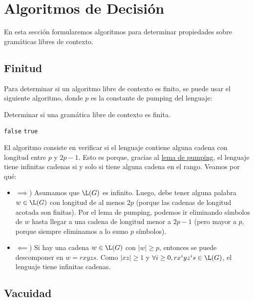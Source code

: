 \section{Algoritmos de Decisión}

En esta sección formularemos algoritmos para determinar propiedades sobre gramáticas libres de contexto.

\subsection{Finitud}

Para determinar si un algoritmo libre de contexto es finito, se puede usar el siguiente algoritmo, donde $p$ es la constante de pumping del lenguaje:

\begin{algorithm}[H]
    \caption{Determinar si una gramática libre de contexto es finita.}
    \label{glc-finita}
    \begin{algorithmic}[1]
        \State \Return \texttt{false}
        \Else
        \State \Return \texttt{true}
        \EndIf
        \EndProcedure
    \end{algorithmic}
\end{algorithm}

El algoritmo consiste en verificar si el lenguaje contiene alguna cadena con longitud entre $p$ y $2p - 1$. Esto es porque, gracias al \hyperref[pumping-libre-de-contexto]{lema de pumping}, el lenguaje tiene infinitas cadenas si y solo si tiene alguna cadena en el rango. Veamos por qué:
\begin{itemize}
    \item $\implies$) Asumamos que $\L(G)$ es infinito. Luego, debe tener alguna palabra $w \in \L(G)$ con longitud de al menos $2p$ (porque las cadenas de longitud acotada son finitas). Por el lema de pumping, podemos ir eliminando símbolos de $w$ hasta llegar a una cadena de longitud menor a $2p - 1$ (pero mayor a $p$, porque siempre eliminamos a lo sumo $p$ símbolos).
    \item $\impliedby$) Si hay una cadena $w \in \L(G)$ con $|w| \geq p$, entonces se puede descomponer en $w = rxyzs$. Como $|xz| \geq 1$ y $\forall i \geq 0, rx^iyz^is \in \L(G)$, el lenguaje tiene infinitas cadenas.
\end{itemize}

\subsection{Vacuidad}

